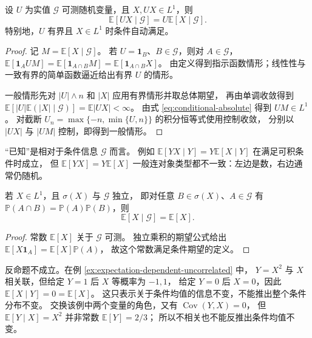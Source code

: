 \documentclass[UTF8]{ctexart}
\begin{document}
\begin{proposition}[提出已知的量]
\label{prop:conditional-pullout}
设 $U$ 为实值 $\mathcal G$ 可测随机变量，且 $X,UX\in L^1$，则
\begin{equation}
  \mathbb E[UX\mid\mathcal G]
  =U\mathbb E[X\mid\mathcal G].
  \label{eq:conditional-pullout}
\end{equation}
特别地，$U$ 有界且 $X\in L^1$ 时条件自动满足。
\end{proposition}

\begin{proof}
记 $M=\mathbb E[X\mid\mathcal G]$。
若 $U=\mathbf1_B$、$B\in\mathcal G$，则对 $A\in\mathcal G$，
$\mathbb E[\mathbf1_AUM]=\mathbb E[\mathbf1_{A\cap B}M]
=\mathbb E[\mathbf1_{A\cap B}X]$。
由定义得到指示函数情形；线性性与一致有界的简单函数逼近给出有界 $U$ 的情形。

一般情形先对 $|U|\wedge n$ 和 $|X|$ 应用有界情形并取总体期望，
再由单调收敛得到
$\mathbb E[|U|\mathbb E(|X|\mid\mathcal G)]=\mathbb E|UX|<\infty$。
由式 \eqref{eq:conditional-absolute} 得到 $UM\in L^1$。
对截断 $U_n=\max\{-n,\min\{U,n\}\}$ 的积分恒等式使用控制收敛，
分别以 $|UX|$ 与 $|UM|$ 控制，即得到一般情形。
\end{proof}

“已知”是相对于条件信息 $\mathcal G$ 而言。
例如 $\mathbb E[Y X\mid Y]=Y\mathbb E[X\mid Y]$ 在满足可积条件时成立，
但 $\mathbb E[YX]=Y\mathbb E[X]$ 一般连对象类型都不一致：左边是数，右边通常仍随机。

\begin{proposition}[独立信息不改变均值]
\label{prop:conditional-independence}
若 $X\in L^1$，且 $\sigma(X)$ 与 $\mathcal G$ 独立，
即对任意 $B\in\sigma(X)$、$A\in\mathcal G$ 有
$\mathbb P(A\cap B)=\mathbb P(A)\mathbb P(B)$，则
\[
  \mathbb E[X\mid\mathcal G]=\mathbb E[X].
\]
\end{proposition}

\begin{proof}
常数 $\mathbb E[X]$ 关于 $\mathcal G$ 可测。
独立乘积的期望公式给出
$\mathbb E[X\mathbf1_A]=\mathbb E[X]\mathbb P(A)$，
故这个常数满足条件期望的定义。
\end{proof}

反命题不成立。在例 \ref{ex:expectation-dependent-uncorrelated} 中，
$Y=X^2$ 与 $X$ 相关联，但给定 $Y=1$ 后 $X$ 等概率为 $-1,1$，
给定 $Y=0$ 后 $X=0$，因此
$\mathbb E[X\mid Y]=0=\mathbb E[X]$。
这只表示关于条件均值的信息不变，不能推出整个条件分布不变。
交换该例中两个变量的角色，又有 $\operatorname{Cov}(Y,X)=0$，
但 $\mathbb E[Y\mid X]=X^2$ 并非常数 $\mathbb E[Y]=2/3$；
所以不相关也不能反推出条件均值不变。
\end{document}
